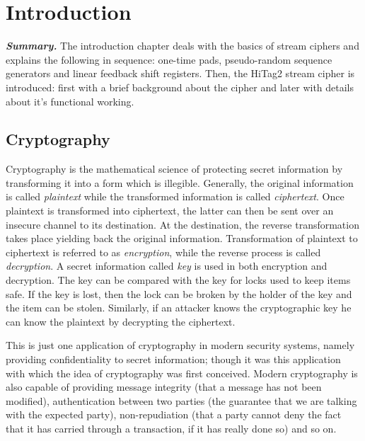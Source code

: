 \chapter{Introduction}
\label{chapter:intro}

\indent \textbf{\textit{Summary.}} The introduction chapter deals with the basics of stream ciphers and explains the following in sequence: one-time pads, pseudo-random sequence generators and linear feedback shift registers. Then, the HiTag2 stream cipher is introduced: first with a brief background about the cipher and later with details about it's functional working. 

\section{Cryptography}

Cryptography is the mathematical science of protecting secret information by transforming it into a form which is illegible. Generally, the original information is called \textit{plaintext} while the transformed information is called \textit{ciphertext}. Once plaintext is transformed into ciphertext, the latter can then be sent over an insecure channel to its destination. At the destination, the reverse transformation takes place yielding back the original information. Transformation of plaintext to ciphertext is referred to as \textit{encryption}, while the reverse process is called \textit{decryption}. A secret information called \textit{key} is used in both encryption and decryption. The key can be compared with the key for locks used to keep items safe. If the key is lost, then the lock can be broken by the holder of the key and the item can be stolen. Similarly, if an attacker knows the cryptographic key he can know the plaintext by decrypting the ciphertext.  

This is just one application of cryptography in modern security systems, namely providing confidentiality to secret information; though it was this application with which the idea of cryptography was first conceived. Modern cryptography is also capable of providing message integrity (that a message has not been modified), authentication between two parties (the guarantee that we are talking with the expected party), non-repudiation (that a party cannot deny the fact that it has carried through a transaction, if it has really done so) and so on. 

